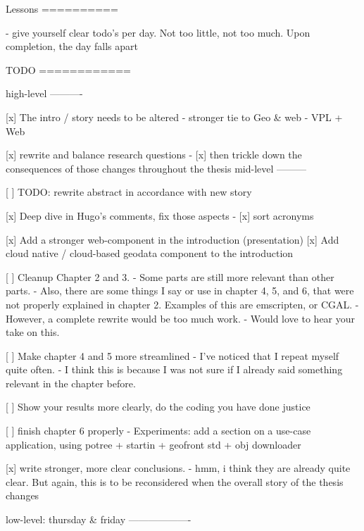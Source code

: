 % 





\begin{note}

  Lessons
  ==========
  
  - give yourself clear todo's per day. 
    Not too little, not too much.
    Upon completion, the day falls apart
  
  
  TODO
  ============
  
  high-level
  ----------
  
  [x] The intro / story needs to be altered 
      - stronger tie to Geo & web
      - VPL + Web
  
  [x] rewrite and balance research questions
  - [x] then trickle down the consequences of those changes throughout the thesis
  mid-level
  ---------
  
  [ ] TODO: rewrite abstract in accordance with new story

  [x] Deep dive in Hugo's comments, fix those aspects 
    - [x] sort acronyms
  
  [x] Add a stronger web-component in the introduction (presentation)
  [x] Add cloud native / cloud-based geodata component to the introduction  
  
  [ ] Cleanup Chapter 2 and 3.  
    - Some parts are still more relevant than other parts. 
    - Also, there are some things I say or use in chapter 4, 5, and 6, that were not properly explained in chapter 2. Examples of this are emscripten, or CGAL. 
    - However, a complete rewrite would be too much work.
    - Would love to hear your take on this.
  
  [ ] Make chapter 4 and 5 more streamlined 
    - I've noticed that I repeat myself quite often.
    - I think this is because I was not sure if I already said something relevant in the chapter before.
  
  [ ] Show your results more clearly, do the coding you have done justice
  
  [ ] finish chapter 6 properly 
    - Experiments: add a section on a use-case application, using potree + startin + geofront std + obj downloader
  
  [x] write stronger, more clear conclusions.
    - hmm, i think they are already quite clear. But again, this is to be reconsidered when the overall story of the thesis changes  
  
  low-level: thursday & friday
  -------------------


\end{note}
